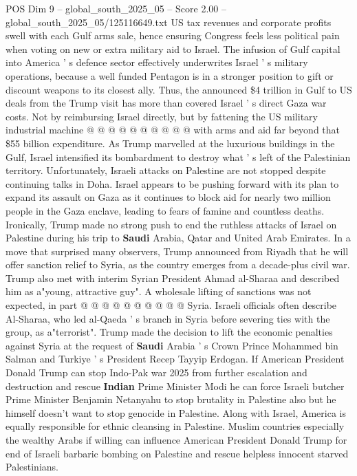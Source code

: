 \begin{textsample}{POS Dim 9 – global\_south\_2025\_05 – Score 2.00 – global\_south\_2025\_05/125116649.txt}
US tax revenues and corporate profits swell with each Gulf arms sale, hence ensuring Congress feels less political pain when voting on new or extra military aid to Israel.
The infusion of Gulf capital into America ' s defence sector effectively underwrites Israel ' s military operations, because a well funded Pentagon is in a stronger position to gift or discount weapons to its closest ally.
Thus, the announced \$4 trillion in Gulf to US deals from the Trump visit has more than covered Israel ' s direct Gaza war costs.
Not by reimbursing Israel directly, but by fattening the US military industrial machine @ @ @ @ @ @ @ @ @ @ with arms and aid far beyond that \$55 billion expenditure.
As Trump marvelled at the luxurious buildings in the Gulf, Israel intensified its bombardment to destroy what ' s left of the Palestinian territory.
Unfortunately, Israeli attacks on Palestine are not stopped despite continuing talks in Doha.
Israel appears to be pushing forward with its plan to expand its assault on Gaza as it continues to block aid for nearly two million people in the Gaza enclave, leading to fears of famine and countless deaths.
Ironically, Trump made no strong push to end the ruthless attacks of Israel on Palestine during his trip to \textbf{Saudi} Arabia, Qatar and United Arab Emirates.
In a move that surprised many observers, Trump announced from Riyadh that he will offer sanction relief to Syria, as the country emerges from a decade-plus civil war.
Trump also met with interim Syrian President Ahmad al-Sharaa and described him as a"young, attractive guy".
A wholesale lifting of sanctions was not expected, in part @ @ @ @ @ @ @ @ @ @ Syria.
Israeli officials often describe Al-Sharaa, who led al-Qaeda ' s branch in Syria before severing ties with the group, as a"terrorist".
Trump made the decision to lift the economic penalties against Syria at the request of \textbf{Saudi} Arabia ' s Crown Prince Mohammed bin Salman and Turkiye ' s President Recep Tayyip Erdogan.
If American President Donald Trump can stop Indo-Pak war 2025 from further escalation and destruction and rescue \textbf{Indian} Prime Minister Modi he can force Israeli butcher Prime Minister Benjamin Netanyahu to stop brutality in Palestine also but he himself doesn't want to stop genocide in Palestine.
Along with Israel, America is equally responsible for ethnic cleansing in Palestine.
Muslim countries especially the wealthy Arabs if willing can influence American President Donald Trump for end of Israeli barbaric bombing on Palestine and rescue helpless innocent starved Palestinians.

\end{textsample}
